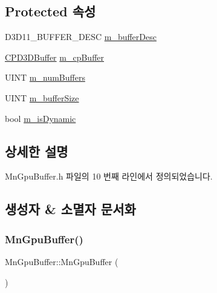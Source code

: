 \subsection*{Protected 속성}
\begin{DoxyCompactItemize}
\item 
D3\+D11\+\_\+\+B\+U\+F\+F\+E\+R\+\_\+\+D\+E\+SC \hyperlink{class_m_n_l_1_1_mn_gpu_buffer_ac37d75136ddee08ebf61d2d188dd4b01}{m\+\_\+buffer\+Desc}
\item 
\hyperlink{namespace_m_n_l_aab9c90a8c27ac6410a9cc7cd89efeef1}{C\+P\+D3\+D\+Buffer} \hyperlink{class_m_n_l_1_1_mn_gpu_buffer_ac5394da182d4d9955e743b040103fba6}{m\+\_\+cp\+Buffer}
\item 
U\+I\+NT \hyperlink{class_m_n_l_1_1_mn_gpu_buffer_a440a564ce0bf811c835516627079d1a5}{m\+\_\+num\+Buffers}
\item 
U\+I\+NT \hyperlink{class_m_n_l_1_1_mn_gpu_buffer_a275688eb205f74155a813a1ba65e149f}{m\+\_\+buffer\+Size}
\item 
bool \hyperlink{class_m_n_l_1_1_mn_gpu_buffer_af93d67fac012bafe36e2a052096f63ce}{m\+\_\+is\+Dynamic}
\end{DoxyCompactItemize}


\subsection{상세한 설명}


Mn\+Gpu\+Buffer.\+h 파일의 10 번째 라인에서 정의되었습니다.



\subsection{생성자 \& 소멸자 문서화}
\mbox{\label{class_m_n_l_1_1_mn_gpu_buffer_a7384edf2315dcacd76e090bd80cf3c72}} 
\subsubsection{\texorpdfstring{Mn\+Gpu\+Buffer()}{MnGpuBuffer()}}
{\footnotesize\ttfamily Mn\+Gpu\+Buffer\+::\+Mn\+Gpu\+Buffer (\begin{DoxyParamCaption}{ }\end{DoxyParamCaption})}



